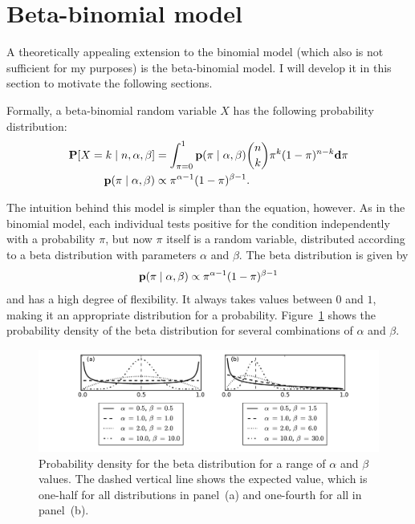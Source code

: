 \section{Beta-binomial model}
\label{beta-binomial-model}
A theoretically appealing extension to the binomial model (which also
is not sufficient for my purposes) is the beta-binomial model.  I will
develop it in this section to motivate the following sections.

Formally, a beta-binomial random variable $X$ has the following
probability distribution:
\begin{align*}
\mathbf{P}[X = k\;|\; n, \alpha, \beta]  &= \int_{\pi=0}^1 \mathbf{p}(\pi\;|\; \alpha, \beta) \binom{n}{k}\pi^k(1-\pi)^{n-k} \mathbf{d}\pi\\
\mathbf{p}(\pi\;|\; \alpha, \beta) &\propto \pi^{\alpha-1}(1-\pi)^{\beta-1}.
\end{align*}

The intuition behind this model is simpler than the equation,
however. As in the binomial model, each individual tests positive for
the condition independently with a probability $\pi$, but now $\pi$
itself is a random variable, distributed according to a beta
distribution with parameters $\alpha$ and $\beta$. The beta
distribution is given by
\[
\mathbf{p}(\pi\;|\; \alpha, \beta)
\propto \pi^{\alpha-1}(1-\pi)^{\beta-1}
\]
and has a high degree of flexibility.  It always takes values
between $0$ and $1$, making it an appropriate distribution for a
probability.  Figure~\ref{rate-model-beta} shows the probability
density of the beta distribution for several combinations of $\alpha$
and $\beta$.
\begin{figure}[ht]
\begin{center}
\includegraphics[width=\textwidth]{beta-distribution.pdf}
\end{center}
\caption{Probability density for the beta distribution for a range of
  $\alpha$ and $\beta$ values. The dashed vertical line shows the expected value,
  which is one-half for all distributions in panel~(a) and
  one-fourth for all in panel~(b).}
\label{rate-model-beta}
\end{figure}


